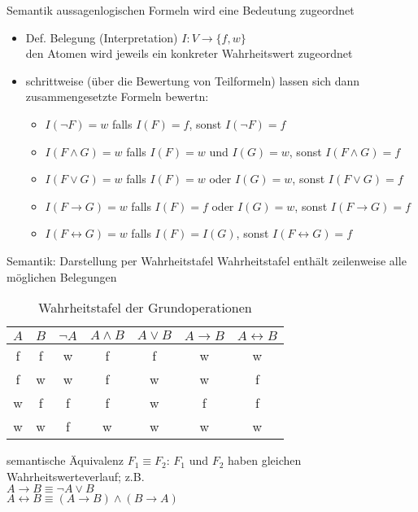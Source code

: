 \begin{frame}{Semantik}
	aussagenlogischen Formeln wird eine Bedeutung zugeordnet
	\begin{itemize}
		\item Def. Belegung (Interpretation) $I: V \rightarrow \{f, w\}$\\ den Atomen wird jeweils ein konkreter Wahrheitswert zugeordnet
		\item schrittweise (über die Bewertung von Teilformeln) lassen sich dann zusammengesetzte Formeln bewertn:
		\begin{itemize}
			\item $I(\neg F)=w$ falls $I(F)=f$, sonst $I(\neg F)=f$
			\item $I(F \land G)=w$ falls $I(F)=w$ und $I(G)=w$, sonst $I(F \land G)=f$
			\item $I(F \lor G)=w$ falls $I(F)=w$ oder $I(G)=w$, sonst $I(F \lor G)=f$
			\item $I(F \rightarrow G)=w$ falls $I(F)=f$ oder $I(G)=w$, sonst $I(F \rightarrow G)=f$
			\item $I(F \leftrightarrow G)=w$ falls $I(F)=I(G)$, sonst $I(F \leftrightarrow G)=f$
		\end{itemize}
	\end{itemize}
\end{frame}

\begin{frame}{Semantik: Darstellung per Wahrheitstafel}
	Wahrheitstafel enthält zeilenweise alle möglichen Belegungen
	\begin{table}
		\centering
			\begin{tabular}{|c|c|c|c|c|c|c|}
				\hline
				$A$ & $B$ & $\neg A$ & $A \land B$ & $A \lor B$ & $A \rightarrow B$ & $A \leftrightarrow B$ \\
				\hline
				f & f & w & f & f & w & w \\
				\hline
				f & w & w & f & w & w & f \\
				\hline
				w & f & f & f & w & f & f \\
				\hline
				w & w & f & w & w & w & w \\
				\hline
			\end{tabular}
			\caption{Wahrheitstafel der Grundoperationen}
		\end{table}
		semantische Äquivalenz $F_1 \equiv F_2$: $F_1$ und $F_2$ haben gleichen Wahrheitswerteverlauf; z.B.\\
		$A \rightarrow B \equiv \neg A \lor B$\\
		$A \leftrightarrow B \equiv (A \rightarrow B) \land (B \rightarrow A)$
\end{frame}

